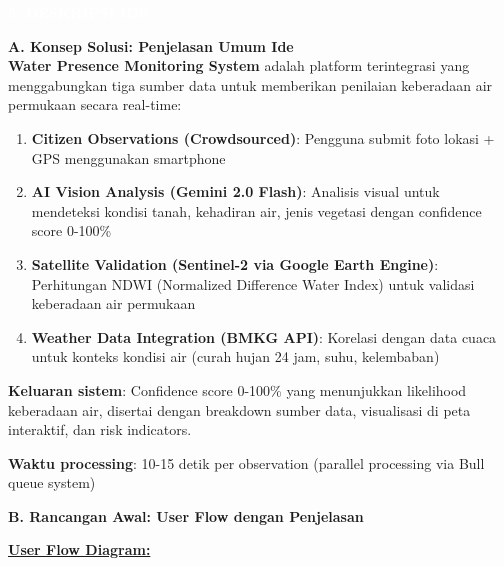 \documentclass[12pt,a4paper]{article}
\newcommand{\sectionbox}[1]{%
  \colorbox{samsungblue}{%
    \parbox{\textwidth}{%
      \textcolor{white}{\large\bfseries #1}%
    }%
  }%
}
\newcommand{\subsectionbox}[1]{%
  \textbf{\large #1}\\[0.3cm]
}
\begin{document}
\vspace{1cm}

\sectionbox{5. DESKRIPSI IDE}

\vspace{0.5cm}

\subsectionbox{A. Konsep Solusi: Penjelasan Umum Ide}

\textbf{Water Presence Monitoring System} adalah platform terintegrasi yang menggabungkan tiga sumber data untuk memberikan penilaian keberadaan air permukaan secara real-time:

\begin{enumerate}
  \item \textbf{Citizen Observations (Crowdsourced)}: Pengguna submit foto lokasi + GPS menggunakan smartphone
  \item \textbf{AI Vision Analysis (Gemini 2.0 Flash)}: Analisis visual untuk mendeteksi kondisi tanah, kehadiran air, jenis vegetasi dengan confidence score 0-100\%
  \item \textbf{Satellite Validation (Sentinel-2 via Google Earth Engine)}: Perhitungan NDWI (Normalized Difference Water Index) untuk validasi keberadaan air permukaan
  \item \textbf{Weather Data Integration (BMKG API)}: Korelasi dengan data cuaca untuk konteks kondisi air (curah hujan 24 jam, suhu, kelembaban)
\end{enumerate}

\textbf{Keluaran sistem}: Confidence score 0-100\% yang menunjukkan likelihood keberadaan air, disertai dengan breakdown sumber data, visualisasi di peta interaktif, dan risk indicators.

\textbf{Waktu processing}: 10-15 detik per observation (parallel processing via Bull queue system)

\subsectionbox{B. Rancangan Awal: User Flow dengan Penjelasan}

\vspace{0.3cm}

\textbf{\underline{User Flow Diagram:}}
\end{document}
